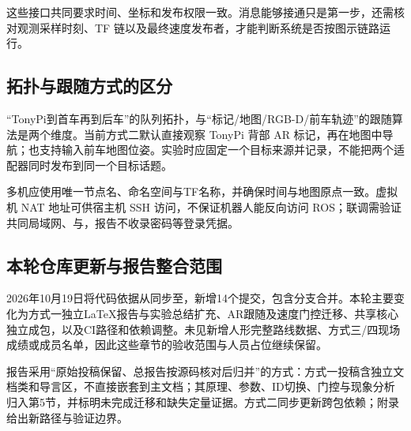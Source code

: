 这些接口共同要求时间、坐标和发布权限一致。消息能够接通只是第一步，还需核对观测采样时刻、TF 链以及最终速度发布者，才能判断系统是否按图示链路运行。


\subsection{拓扑与跟随方式的区分}
“TonyPi到首车再到后车”的队列拓扑，与“标记/地图/RGB-D/前车轨迹”的跟随算法是两个维度。当前方式二默认直接观察 TonyPi 背部 AR 标记，再在地图中导航；也支持输入前车地图位姿。实验时应固定一个目标来源并记录，不能把两个适配器同时发布到同一个目标话题。

多机应使用唯一节点名、命名空间与TF名称，并确保时间与地图原点一致。虚拟机 NAT 地址可供宿主机 SSH 访问，不保证机器人能反向访问 ROS；联调需验证共同局域网、与，报告不收录密码等登录凭据。

\subsection{本轮仓库更新与报告整合范围}
2026年10月19日将代码依据从同步至，新增14个提交，包含分支合并。本轮主要变化为方式一独立LaTeX报告与实验总结扩充、AR跟随及速度门控迁移、共享核心独立成包，以及CI路径和依赖调整。未见新增人形完整路线数据、方式三/四现场成绩或成员名单，因此这些章节的验收范围与人员占位继续保留。

报告采用“原始投稿保留、总报告按源码核对后归并”的方式：方式一投稿含独立文档类和导言区，不直接嵌套到主文档；其原理、参数、ID切换、门控与现象分析归入第5节，并标明未完成迁移和缺失定量证据。方式二同步更新跨包依赖；附录给出新路径与验证边界。

